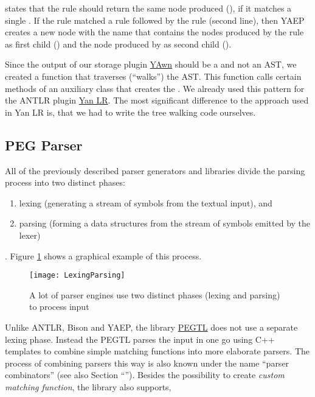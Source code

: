 states that the rule  should return the same node  produced (), if it matches a single . If the rule  matched a rule  followed by the rule  (second line), then YAEP creates a new node with the name  that contains the nodes produced by the rule  as first child () and the node produced by  as second child ().

Since the output of our storage plugin \href{https://www.libelektra.org/plugins/yawn}{YAwn} should be a  and not an \gls{AST}, we created a function that traverses (“walks”) the \gls{AST}. This function calls certain methods of an auxiliary class  that creates the . We already used this pattern for the ANTLR plugin \href{https://www.libelektra.org/plugins/yanlr}{Yan LR}. The most significant difference to the approach used in Yan LR is, that we had to write the tree walking code ourselves.

\subsection{PEG Parser}

All of the previously described parser generators and libraries divide the parsing process into two distinct phases:

\begin{enumerate}
  \item lexing (generating a stream of symbols from the textual input), and
  \item parsing (forming a data structures from the stream of symbols emitted by the lexer)
\end{enumerate}

. Figure \ref{fig:lexing_parsing} shows a graphical example of this process.

\begin{figure}
  \centering
    \texttt{[image: LexingParsing]}
  \caption{A lot of parser engines use two distinct phases (lexing and parsing) to process input}
  \label{fig:lexing_parsing}
\end{figure}

Unlike ANTLR, Bison and YAEP, the library \href{https://github.com/taocpp/PEGTL}{PEGTL} does not use a separate lexing phase. Instead the \gls{PEGTL} parses the input in one go using C++ templates to combine simple matching functions into more elaborate parsers. The process of combining parsers this way is also known under the name “parser combinators” (see also Section “”). Besides the possibility to create \emph{custom matching function}, the library also supports,

